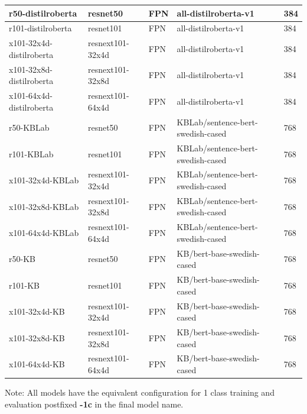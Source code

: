 \documentclass[oneside, english, bibtex]{kththesis}
\begin{document}
\begin{table}[H]
\begin{center}
\begin{adjustbox}{width=1.2\textwidth,center=\textwidth}
{\begin{tabular}{l|l|l|l|p{1.5cm}}
    r50-distilroberta & resnet50 & FPN & all-distilroberta-v1 & 384 \\     \hline
    r101-distilroberta & resnet101 & FPN & all-distilroberta-v1 & 384 \\     \hline
    x101-32x4d-distilroberta & resnext101-32x4d& FPN & all-distilroberta-v1 & 384 \\     \hline
    x101-32x8d-distilroberta & resnext101-32x8d& FPN & all-distilroberta-v1 & 384 \\     \hline
    x101-64x4d-distilroberta & resnext101-64x4d & FPN & all-distilroberta-v1 & 384 \\     \hline

    r50-KBLab & resnet50 & FPN & KBLab/sentence-bert-swedish-cased & 768 \\     \hline
    r101-KBLab & resnet101 & FPN & KBLab/sentence-bert-swedish-cased & 768 \\     \hline
    x101-32x4d-KBLab & resnext101-32x4d & FPN & KBLab/sentence-bert-swedish-cased & 768 \\     \hline
    x101-32x8d-KBLab & resnext101-32x8d & FPN & KBLab/sentence-bert-swedish-cased & 768 \\     \hline
    x101-64x4d-KBLab & resnext101-64x4d & FPN & KBLab/sentence-bert-swedish-cased & 768 \\     \hline

    r50-KB & resnet50 & FPN & KB/bert-base-swedish-cased & 768 \\     \hline
    r101-KB & resnet101 & FPN & KB/bert-base-swedish-cased & 768 \\     \hline
    x101-32x4d-KB & resnext101-32x4d & FPN & KB/bert-base-swedish-cased & 768 \\     \hline
    x101-32x8d-KB & resnext101-32x8d & FPN & KB/bert-base-swedish-cased & 768 \\     \hline
    x101-64x4d-KB & resnext101-64x4d & FPN & KB/bert-base-swedish-cased & 768 \\     \hline
    \end{tabular}
    }
    \end{adjustbox} 
  \end{center}
\begin{center}
Note: All models have the equivalent configuration for 1 class training and evaluation postfixed \textbf{-1c} in the final model name.
\end{center}
\end{table}


\clearpage
\end{document}
